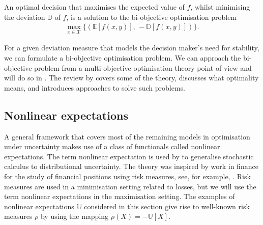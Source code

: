 \documentclass[main.tex]{subfiles}
\begin{document}
\begin{problem}
  An optimal decision that maximises the expected value of $f$, whilst
  minimising the deviation $\mathbb{D}$ of $f$, is a solution to the
  bi-objective optimisation problem
  \begin{align}
    \max_{x\in\mathcal{X}}\{(\mathbb{E}[f(x,y)],\,-\mathbb{D}[f(x,y)])\}.
  \end{align}
\end{problem}
For a given deviation measure that models the decision maker's
need for stability, we can formulate a bi-objective optimisation
problem.
We can approach the bi-objective problem from a multi-objective
optimisation theory point of view and will do so in
.
The review by \citet{marler2004survey} covers some of the theory,
discusses what optimality means, and introduces approaches to solve
such problems.


\subsection{Nonlinear expectations}\label{sec:nonlinear_expectations}
A general framework that covers most of the remaining models
in optimisation under uncertainty makes use of a class of functionals
called nonlinear expectations. The term nonlinear expectation is used
by \citet{peng2010nonlinear} to generalise stochastic calculus to
distributional uncertainty.
The theory was inspired by work in finance for the study of financial
positions using
risk measures, see,
for example, \citet[Ch.~4]{follmer2004stochastic}.
Risk measures are used in a minimisation setting related to losses,
but we will use the term nonlinear expectations in the maximisation
setting. The examples of nonlinear expectations $\mathbb{U}$ considered
in this section give rise to well-known risk measures $\rho$ by using the mapping
$\rho(X) = -\mathbb{U}[X]$.
\end{document}
